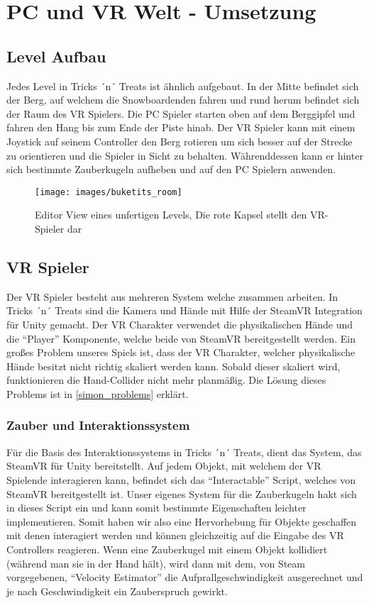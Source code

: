 \chapter{PC und VR Welt - Umsetzung}
\section{Level Aufbau}
Jedes Level in Tricks ´n´ Treats ist ähnlich aufgebaut. 
In der Mitte befindet sich der Berg, auf welchem die Snowboardenden fahren und rund herum befindet sich der Raum des VR Spielers. Die PC Spieler starten oben auf dem Berggipfel und fahren den Hang bis zum Ende der Piste hinab. Der VR Spieler kann mit einem Joystick auf seinem Controller den Berg rotieren um sich besser auf der Strecke zu orientieren und die Spieler in Sicht zu behalten. Währenddessen kann er hinter sich bestimmte Zauberkugeln aufheben und auf den PC Spielern anwenden.

\begin{figure}[h]
	\centering
	\texttt{[image: images/buketits\_room]}
	\caption{Editor View eines unfertigen Levels, Die rote Kapsel stellt den VR-Spieler dar}
\end{figure}

\section{VR Spieler} \label{simon_vrspieler}
Der VR Spieler besteht aus mehreren System welche zusammen arbeiten. In Tricks ´n´ Treats sind die Kamera und Hände mit Hilfe der SteamVR Integration für Unity gemacht. Der VR Charakter verwendet die physikalischen Hände und die "`Player"' Komponente, welche beide von SteamVR bereitgestellt werden. Ein großes Problem unseres Spiels ist, dass der VR Charakter, welcher physikalische Hände besitzt nicht richtig skaliert werden kann. Sobald dieser skaliert wird, funktionieren die Hand-Collider nicht mehr planmäßig. Die Lösung dieses Problems ist in \ref{simon_problems} erklärt.

\subsection{Zauber und Interaktionssystem}
Für die Basis des Interaktionssystems in Tricks ´n´ Treats, dient das System, das SteamVR für Unity bereitstellt. Auf jedem Objekt, mit welchem der VR Spielende interagieren kann, befindet sich das "`Interactable"' Script, welches von SteamVR bereitgestellt ist. Unser eigenes System für die Zauberkugeln hakt sich in dieses Script ein und kann somit bestimmte Eigenschaften leichter implementieren. Somit haben wir also eine Hervorhebung für Objekte geschaffen mit denen interagiert werden und können gleichzeitig auf die Eingabe des VR Controllers reagieren. Wenn eine Zauberkugel mit einem Objekt kollidiert (während man sie in der Hand hält), wird dann mit dem, von Steam vorgegebenen, "`Velocity Estimator"' die Aufprallgeschwindigkeit ausgerechnet und je nach Geschwindigkeit ein Zauberspruch gewirkt.

